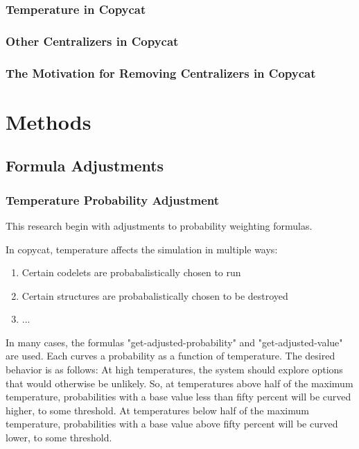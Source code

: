\documentclass[a4paper]{article}
\begin{document}
        \subsubsection{Temperature in Copycat}
        \subsubsection{Other Centralizers in Copycat}
        \subsubsection{The Motivation for Removing Centralizers in Copycat}
\section{Methods}
    \subsection{Formula Adjustments}
        \subsubsection{Temperature Probability Adjustment}

            This research begin with adjustments to probability weighting formulas.

            In copycat, temperature affects the simulation in multiple ways:

            \begin{enumerate}
                \item Certain codelets are probabalistically chosen to run
                \item Certain structures are probabalistically chosen to be destroyed
                \item ...
            \end{enumerate}

            In many cases, the formulas "get-adjusted-probability" and "get-adjusted-value" are used.
            Each curves a probability as a function of temperature.
            The desired behavior is as follows:
            At high temperatures, the system should explore options that would otherwise be unlikely.
            So, at temperatures above half of the maximum temperature, probabilities with a base value less than fifty percent will be curved higher, to some threshold.
            At temperatures below half of the maximum temperature, probabilities with a base value above fifty percent will be curved lower, to some threshold.
\end{document}
